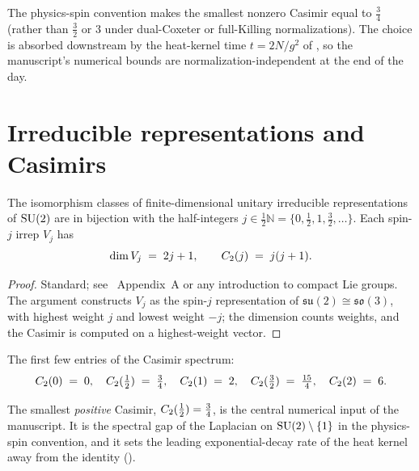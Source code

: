 \begin{infobox}[main][title=Why this convention]
The physics-spin convention makes the smallest nonzero Casimir
equal to $\tfrac34$ (rather than $\tfrac32$ or $3$ under
dual-Coxeter or full-Killing normalizations).  The choice is
absorbed downstream by the heat-kernel time
$t = 2N/g^2$ of , so the manuscript's
numerical bounds are normalization-independent at the end of the
day.
\end{infobox}

\section{Irreducible representations and Casimirs}
\label{sec:irreps}

\begin{theorem}
\label{thm:irrep-classification}
The isomorphism classes of finite-dimensional unitary irreducible
representations of $\mathrm{SU}(2)$ are in bijection with the half-integers
$j \in \tfrac12\mathbb{N} = \{0, \tfrac12, 1, \tfrac32, \dots\}$.
Each spin-$j$ irrep $V_j$ has
\begin{equation}
  \label{eq:irrep-data}
  \dim V_j \;=\; 2j + 1, \qquad
  C_2(j) \;=\; j(j + 1) .
\end{equation}
\end{theorem}

\begin{proof}
Standard; see~\cite{GlimmJaffe1987} Appendix~A or any introduction to
compact Lie groups.  The argument constructs $V_j$ as the spin-$j$
representation of $\mathfrak{su}(2) \cong \mathfrak{so}(3)$, with
highest weight $j$ and lowest weight $-j$; the dimension counts
weights, and the Casimir is computed on a highest-weight vector.
\end{proof}

The first few entries of the Casimir spectrum:
\begin{equation}
  \label{eq:casimir-spectrum}
  C_2(0) \;=\; 0, \quad
  C_2(\tfrac12) \;=\; \tfrac{3}{4}, \quad
  C_2(1) \;=\; 2, \quad
  C_2(\tfrac32) \;=\; \tfrac{15}{4}, \quad
  C_2(2) \;=\; 6 .
\end{equation}

%
The smallest \emph{positive} Casimir, $C_2(\tfrac12) = \tfrac34$,
is the central numerical input of the manuscript.  It is the
spectral gap of the Laplacian on $\mathrm{SU}(2) \setminus \{1\}$ in the
physics-spin convention, and it sets the leading exponential-decay
rate of the heat kernel away from the identity
().

